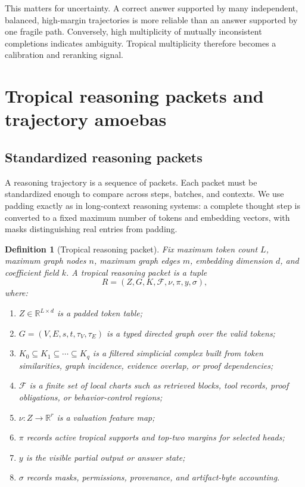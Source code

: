 \documentclass[11pt]{article}
\newtheorem{definition}{Definition}[section]
\newcommand{\R}{\mathbb{R}}
\newcommand{\calF}{\mathcal{F}}
\begin{document}
This matters for uncertainty.  A correct answer supported by many independent, balanced, high-margin trajectories is more reliable than an answer supported by one fragile path.  Conversely, high multiplicity of mutually inconsistent completions indicates ambiguity.  Tropical multiplicity therefore becomes a calibration and reranking signal.

\section{Tropical reasoning packets and trajectory amoebas}

\subsection{Standardized reasoning packets}

A reasoning trajectory is a sequence of packets.  Each packet must be standardized enough to compare across steps, batches, and contexts.  We use padding exactly as in long-context reasoning systems: a complete thought step is converted to a fixed maximum number of tokens and embedding vectors, with masks distinguishing real entries from padding.

\begin{definition}[Tropical reasoning packet]
Fix maximum token count \(L\), maximum graph nodes \(n\), maximum graph edges \(m\), embedding dimension \(d\), and coefficient field \(k\).  A tropical reasoning packet is a tuple
\begin{equation}
R=(Z,G,K,\calF,\nu,\pi,y,\sigma),
\end{equation}
where:
\begin{enumerate}
\item \(Z\in\R^{L\times d}\) is a padded token table;
\item \(G=(V,E,s,t,\tau_V,\tau_E)\) is a typed directed graph over the valid tokens;
\item \(K_0\subseteq K_1\subseteq\cdots\subseteq K_q\) is a filtered simplicial complex built from token similarities, graph incidence, evidence overlap, or proof dependencies;
\item \(\calF\) is a finite set of local charts such as retrieved blocks, tool records, proof obligations, or behavior-control regions;
\item \(\nu:Z\to\R^r\) is a valuation feature map;
\item \(\pi\) records active tropical supports and top-two margins for selected heads;
\item \(y\) is the visible partial output or answer state;
\item \(\sigma\) records masks, permissions, provenance, and artifact-byte accounting.
\end{enumerate}
\end{definition}
\end{document}
